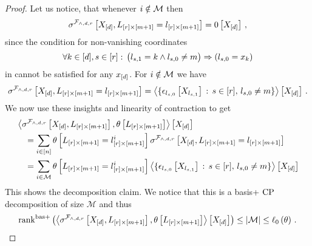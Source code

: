 \begin{proof}
    Let us notice, that whenever $i\notin\mathcal{M}$ then
    \begin{align*}
        \sigma^{\mathcal{F}_{\land,d,r}}\left[X_{[d]},L_{[r]\times[m+1]}=l_{[r]\times[m+1]}\right]
        = 0\left[X_{[d]}\right] \, ,
    \end{align*}
    since the condition for non-vanishing coordinates
    \begin{align*}
        \forall{k\in[d],s\in[r]} : \, \big(l_{s,1} = k \land l_{s,0} \neq m \big) \Rightarrow  (l_{s,0} = x_{k})
    \end{align*}
    in  cannot be satisfied for any $x_{[d]}$.
    For $i\notin\mathcal{M}$ we have
    \begin{align*}
        \sigma^{\mathcal{F}_{\land,d,r}}\left[X_{[d]},L_{[r]\times[m+1]}=l_{[r]\times[m+1]}\right]
        =  \left\langle \{\epsilon_{l_{s,0}}\left[X_{l_{s,1}}\right] \,:\, s\in[r], \, l_{s,0}\neq m \}\right\rangle \left[ X_{[d]} \right] \, .
    \end{align*}
    We now use these insights and linearity of contraction to get
    \begin{align*}
        &\left\langle \sigma^{\mathcal{F}_{\land,d,r}}\left[X_{[d]},L_{[r]\times[m+1]}\right],\theta\left[L_{[r]\times[m+1]}\right]\right\rangle \left[ X_{[d]} \right] \\
        & \quad = \sum_{i\in[n]} \theta\left[L_{[r]\times[m+1]}=l_{[r]\times[m+1]}^{i}\right]
        \sigma^{\mathcal{F}_{\land,d,r}}\left[X_{[d]},L_{[r]\times[m+1]}=l_{[r]\times[m+1]}\right] \\
        & \quad = \sum_{i\in\mathcal{M}} \theta\left[L_{[r]\times[m+1]}=l_{[r]\times[m+1]}^{i}\right]
        \left\langle \{\epsilon_{l_{s,0}}\left[X_{l_{s,1}}\right] \,:\, s\in[r], \, l_{s,0}\neq m \}\right\rangle \left[ X_{[d]} \right]
    \end{align*}
    This shows the decomposition claim.
    We notice that this is a basis+ $\mathrm{CP}$ decomposition of size $\mathcal{M}$ and thus
    \begin{align*}
        \mathrm{rank}^{\mathrm{bas+}}\left(\left\langle \sigma^{\mathcal{F}_{\land,d,r}}\left[X_{[d]},L_{[r]\times[m+1]}\right],\theta\left[L_{[r]\times[m+1]}\right]\right\rangle \left[ X_{[d]} \right]\right)
        \leq \left|\mathcal{M}\right| \leq \ell_0\left(\theta\right) \, .
    \end{align*}
\end{proof}


